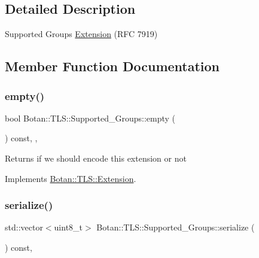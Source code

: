 \subsection{Detailed Description}
Supported Groups \hyperlink{class_botan_1_1_t_l_s_1_1_extension}{Extension} (R\+FC 7919) 

\subsection{Member Function Documentation}
\mbox{\label{class_botan_1_1_t_l_s_1_1_supported___groups_a00ea6c535e6d7198cf6b74c1fb4fe71a}} 
\subsubsection{\texorpdfstring{empty()}{empty()}}
{\footnotesize\ttfamily bool Botan\+::\+T\+L\+S\+::\+Supported\+\_\+\+Groups\+::empty (\begin{DoxyParamCaption}{ }\end{DoxyParamCaption}) const\hspace{0.3cm}{\ttfamily [inline]}, {\ttfamily [override]}, {\ttfamily [virtual]}}

\begin{DoxyReturn}{Returns}
if we should encode this extension or not 
\end{DoxyReturn}


Implements \hyperlink{class_botan_1_1_t_l_s_1_1_extension_aa850b9be2322f94e7c65e583cd51acc5}{Botan\+::\+T\+L\+S\+::\+Extension}.

\mbox{\label{class_botan_1_1_t_l_s_1_1_supported___groups_ad88fb72f307017125cca018982800d76}} 
\subsubsection{\texorpdfstring{serialize()}{serialize()}}
{\footnotesize\ttfamily std\+::vector$<$uint8\+\_\+t$>$ Botan\+::\+T\+L\+S\+::\+Supported\+\_\+\+Groups\+::serialize (\begin{DoxyParamCaption}{ }\end{DoxyParamCaption}) const\hspace{0.3cm}{\ttfamily [override]}, {\ttfamily [virtual]}}

